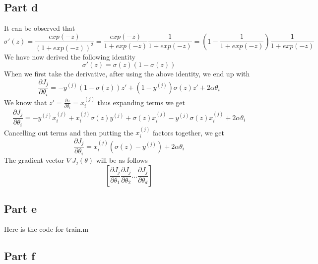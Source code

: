 \documentclass[twoside,11pt]{article}
\theoremstyle{definition}
\begin{document}
\subsection*{Part d}

It can be observed that
\[
\sigma'(z) = \frac{exp(-z)}{(1+exp(-z))^2} = \frac{exp(-z)}{1+exp(-z)} \frac{1}{1+exp(-z)} = (1-\frac{1}{1+exp(-z)})\frac{1}{1+exp(-z)}
\]
We have now derived the following identity
\[
\sigma'(z) = \sigma(z)(1-\sigma(z))
\]
When we first take the derivative, after using the above identity, we end up with
\[
\frac{\partial J_j}{\partial \theta_i} = -y^{(j)} (1-\sigma(z)) z' + (1-y^{(j)}) \sigma(z) z' + 2 \alpha \theta_i
\]
We know that $z' = \frac{\partial z}{\partial \theta_i}= x_i^{(j)}$ thus expanding terms we get
\[
\frac{\partial J_j}{\partial \theta_i} = -y^{(j)}x_i^{(j)} + x_i^{(j)}\sigma(z)y^{(j)} + \sigma(z) x_i^{(j)} -y^{(j)} \sigma(z) x_i^{(j)} + 2 \alpha \theta_i
\]
Cancelling out terms and then putting the $x_i^{(j)}$ factors together, we get
\[
\frac{\partial J_j}{\partial \theta_i} = x_i^{(j)} (\sigma(z) - y^{(j)} ) + 2 \alpha \theta_i
\]
The gradient vector $\nabla J_j(\theta)$ will be as follows
\[
[\frac{\partial J_j}{\partial \theta_1} \frac{\partial J_j}{\partial \theta_2} ... \frac{\partial J_j}{\partial \theta_d}]
\]
\newpage
\subsection*{Part e}

Here is the code for train.m


\newpage

\subsection*{Part f}
\end{document}
